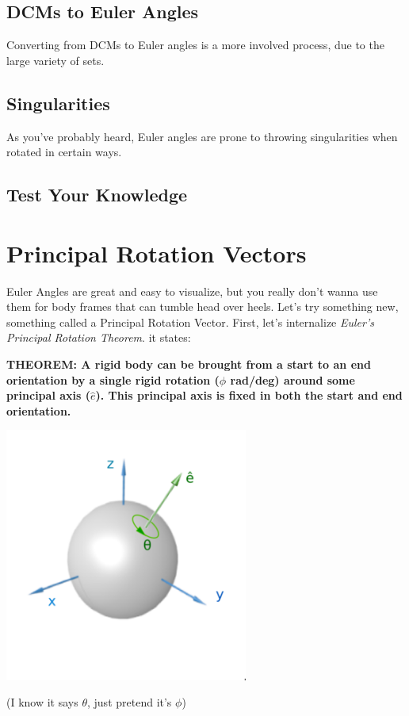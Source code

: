 \documentclass[a4paper,14pt]{extreport}
\begin{document}
\section{DCMs to Euler Angles}
Converting from DCMs to Euler angles is a more involved process, due to the large variety of sets.
\section{Singularities}
As you've probably heard, Euler angles are prone to throwing singularities when rotated in certain ways. 
\section{Test Your Knowledge}

\chapter{Principal Rotation Vectors}

Euler Angles are great and easy to visualize, but you really don't wanna use them for body frames that can tumble head over heels. Let's try something new, something called a Principal Rotation Vector. First, let's internalize \emph{Euler's Principal Rotation Theorem}. it states:

\begin{center}
\textbf{THEOREM: A rigid body can be brought from a start to an end orientation by a single rigid rotation ($\phi$ rad/deg) around some principal axis ($\hat{e}$). This principal axis is fixed in both the start and end orientation.}
\end{center}

\begin{center}
\includegraphics[width=8cm]{PRV1}

(I know it says $\theta$, just pretend it's $\phi$)
\end{center}
\end{document}
